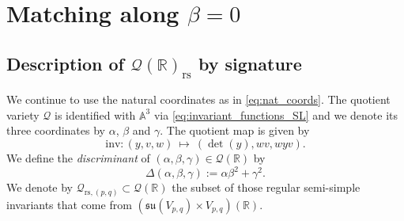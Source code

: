 \documentclass[reqno, 11pt]{amsart} %
\numberwithin{equation}{section}
\theoremstyle{plain}
\theoremstyle{definition}
\theoremstyle{remark}
\newcommand{\mr}{\mathrm}
\newcommand{\mbA}{\mathbb{A}}
\newcommand{\mbR}{\mathbb{R}}
\newcommand{\mcQ}{\mathcal{Q}}
\newcommand{\mfs}{\mathfrak{s}}
\newcommand{\mfu}{\mathfrak{u}}
\newcommand{\rs}{\mr{rs}}
\newcommand{\mfsu}{\mfs\mfu}
\begin{document}
\section{Matching along $\beta = 0$}
\label{s:matching_beta_0}
\subsection{Description of $\mcQ(\mbR)_\rs$ by signature}
\label{ss:geometry_Q}
We continue to use the natural coordinates as in \eqref{eq:nat_coords}. The quotient variety $\mcQ$ is identified with $\mbA^3$ via \eqref{eq:invariant_functions_SL} and we denote its three coordinates by $α$, $β$ and $γ$. The quotient map is given by
$$\mr{inv}:(y, v, w)\ \longmapsto\ (\det(y), wv, wyv).$$
We define the \emph{discriminant} of $(α, β, γ)\in \mcQ(\mbR)$ by
$$Δ(α, β, γ) := αβ^2 + γ^2.$$
We denote by $\mcQ_{\rs,(p,q)}\subset \mcQ(\mbR)$ the subset of those regular semi-simple invariants that come from $(\mfsu(V_{p,q})\times V_{p,q})(\mbR)$.
\end{document}

